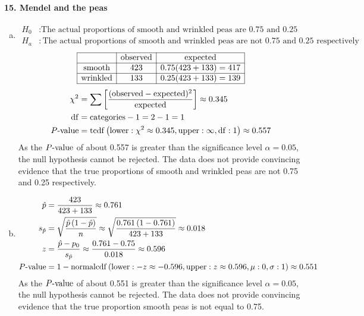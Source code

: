 \documentclass[../Homework]{subfiles}
\begin{document}
		\paragraph{15. Mendel and the peas}
			\begin{enumerate}[a.]
				\item
					\begin{align*}
						H_0&: \text{The actual proportions of smooth and wrinkled peas are 0.75 and 0.25 respectively.} \\
						H_a&: \text{The actual proportions of smooth and wrinkled peas are not \(0.75\) and \(0.25\) respectively}
					\end{align*}
					\[\begin{array}{|c|c|c|}\hline
						& \text{observed} & \text{expected} \\\hline
						\text{smooth} & 423 & 0.75(423 + 133) = 417 \\\hline
						\text{wrinkled} & 133 & 0.25(423 + 133) = 139 \\\hline
					\end{array}\]
					\begin{align*}
						\chi^2 &= \sum\left[\mathrm{\frac{(observed - expected)^2}{expected}}\right] \approx 0.345 \\
						\operatorname{df} &= \text{categories} - 1 = 2 - 1 = 1 \\
						P\text{-value} &= \operatorname{tcdf}\left(\operatorname{lower}: \chi^2 \approx 0.345, \operatorname{upper}: \infty, \operatorname{df}: 1\right) \approx 0.557
					\end{align*}
					As the $P\text{-value}$ of about 0.557 is greater than the significance level $\alpha = 0.05$, the null hypothesis cannot be rejected. The data does not provide convincing evidence that the true proportions of smooth and wrinkled peas are not 0.75 and 0.25 respectively.
				\item
					\begin{align*}
						\hat{p} &= \frac{423}{423 + 133} \approx 0.761 \\
						s_{\hat{p}} &= \sqrt{\frac{\hat{p}\left(1 - \hat{p}\right)}{n}} \approx \sqrt{\frac{0.761\left(1 - 0.761\right)}{423 + 133}} \approx 0.018 \\ 
						z &= \frac{\hat{p} - p_0}{s_{\hat{p}}} \approx \frac{0.761 - 0.75}{0.018} \approx 0.596 \\
						P\text{-value} &= 1 - \operatorname{normalcdf}\left(\operatorname{lower}: -z \approx -0.596, \operatorname{upper}: z \approx 0.596, \mu: 0, \sigma: 1\right) \approx 0.551
					\end{align*}
					As the $P\text{-value}$ of about 0.551 is greater than the significance level $\alpha = 0.05$, the null hypothesis cannot be rejected. The data does not provide convincing evidence that the true proportion smooth peas is not equal to 0.75.
			\end{enumerate}
\end{document}
